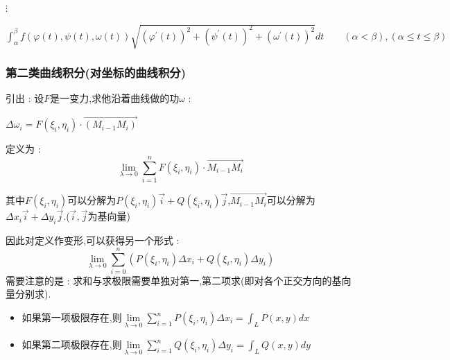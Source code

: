 \documentclass[UTF8,12pt]{ctexbook}
\newcommand{\limNormal}[1]{\lim\limits_{#1}}
\newcommand{\derivative}{^\prime}
\newcommand{\upDownSum}[2]{\sum\limits_{#2}^{#1}}
\newcommand{\defFunction}[1]{f(#1)}
\newcommand{\definiteIntegral}[2]{\int^{#1}_{#2}}
\newcommand{\pathIntegral}[1]{\int_{#1}}
\begin{document}
{{{{\begin{enumerate}
{            $\vdots$

            $\definiteIntegral{\beta}{\alpha}\defFunction{\varphi(t),\psi(t),\omega(t)}\sqrt{(\varphi\derivative(t))^2 + (\psi\derivative(t))^2 + (\omega\derivative(t))^2}dt\qquad (\alpha < \beta),(\alpha \leq t \leq \beta)$
            }
    \end{enumerate}
  }%

  \subsubsection{第二类曲线积分(对坐标的曲线积分)}{
    引出 : 设$F$是一变力,求他沿着曲线做的功$\omega$ :

    \begin{center}
      $\Delta\omega_i = F(\xi_i,\eta_i)\cdot\vec{(M_{i-1}M_i)}$
    \end{center}

    定义为 :
    $$
      \limNormal{\lambda \to 0}\upDownSum{n}{i = 1}F(\xi_i,\eta_i)\cdot\vec{M_{i - 1}M_i}
    $$

    其中$F(\xi_i,\eta_i)$可以分解为$P(\xi_i,\eta_i)\vec{i} + Q(\xi_i,\eta_i)\vec{j}$,$\vec{M_{i - 1}M_i}$可以分解为$\Delta x_i\vec{i} + \Delta y_i\vec{j}$.($\vec{i},\vec{j}$为基向量)

    因此对定义作变形,可以获得另一个形式 :
    $$
    \limNormal{\lambda \to 0}\upDownSum{n}{i = 0}(P(\xi_i,\eta_i)\Delta x_i + Q(\xi_i,\eta_i)\Delta y_i)
    $$
    需要注意的是 : 求和与求极限需要单独对第一,第二项求(即对各个正交方向的基向量分别求).

    \begin{itemize}
      \item 如果第一项极限存在,则$\limNormal{\lambda \to 0}\upDownSum{n}{i = 1}P(\xi_i,\eta_i)\Delta x_i = \pathIntegral{L}P(x,y)dx$
      \item 如果第二项极限存在,则$\limNormal{\lambda \to 0}\upDownSum{n}{i = 1}Q(\xi_i,\eta_i)\Delta y_i = \pathIntegral{L}Q(x,y)dy$
    \end{itemize}

}}}}
\end{document}
